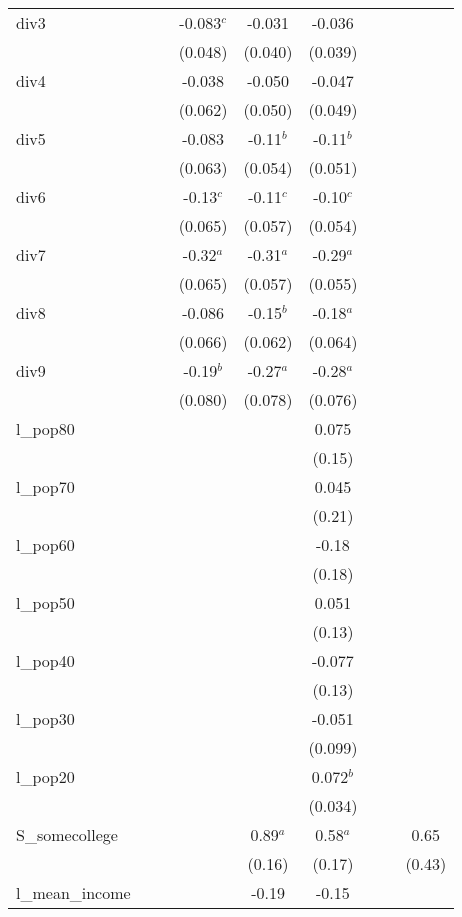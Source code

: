 \documentclass[]{article}
\begin{document}
\begin{tabular}{lcccccccc}
div3 &  &  & -0.083$^c$ & -0.031 & -0.036 &  &  &  \\
 &  &  & (0.048) & (0.040) & (0.039) &  &  &  \\
div4 &  &  & -0.038 & -0.050 & -0.047 &  &  &  \\
 &  &  & (0.062) & (0.050) & (0.049) &  &  &  \\
div5 &  &  & -0.083 & -0.11$^b$ & -0.11$^b$ &  &  &  \\
 &  &  & (0.063) & (0.054) & (0.051) &  &  &  \\
div6 &  &  & -0.13$^c$ & -0.11$^c$ & -0.10$^c$ &  &  &  \\
 &  &  & (0.065) & (0.057) & (0.054) &  &  &  \\
div7 &  &  & -0.32$^a$ & -0.31$^a$ & -0.29$^a$ &  &  &  \\
 &  &  & (0.065) & (0.057) & (0.055) &  &  &  \\
div8 &  &  & -0.086 & -0.15$^b$ & -0.18$^a$ &  &  &  \\
 &  &  & (0.066) & (0.062) & (0.064) &  &  &  \\
div9 &  &  & -0.19$^b$ & -0.27$^a$ & -0.28$^a$ &  &  &  \\
 &  &  & (0.080) & (0.078) & (0.076) &  &  &  \\
l\_pop80 &  &  &  &  & 0.075 &  &  &  \\
 &  &  &  &  & (0.15) &  &  &  \\
l\_pop70 &  &  &  &  & 0.045 &  &  &  \\
 &  &  &  &  & (0.21) &  &  &  \\
l\_pop60 &  &  &  &  & -0.18 &  &  &  \\
 &  &  &  &  & (0.18) &  &  &  \\
l\_pop50 &  &  &  &  & 0.051 &  &  &  \\
 &  &  &  &  & (0.13) &  &  &  \\
l\_pop40 &  &  &  &  & -0.077 &  &  &  \\
 &  &  &  &  & (0.13) &  &  &  \\
l\_pop30 &  &  &  &  & -0.051 &  &  &  \\
 &  &  &  &  & (0.099) &  &  &  \\
l\_pop20 &  &  &  &  & 0.072$^b$ &  &  &  \\
 &  &  &  &  & (0.034) &  &  &  \\
S\_somecollege &  &  &  & 0.89$^a$ & 0.58$^a$ &  &  & 0.65 \\
 &  &  &  & (0.16) & (0.17) &  &  & (0.43) \\
l\_mean\_income &  &  &  & -0.19 & -0.15 &  &  &  \\

\end{tabular}
\end{document}
